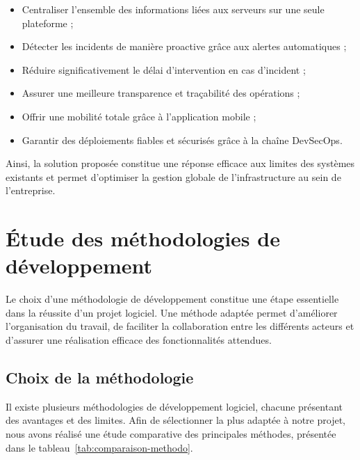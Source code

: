 \begin{itemize}[label=]
\item Centraliser l'ensemble des informations liées aux serveurs sur une seule
      plateforme ;
\item Détecter les incidents de manière proactive grâce aux alertes automatiques ;
\item Réduire significativement le délai d'intervention en cas d'incident ;
\item Assurer une meilleure transparence et traçabilité des opérations ;
\item Offrir une mobilité totale grâce à l'application mobile ;
\item Garantir des déploiements fiables et sécurisés grâce à la chaîne DevSecOps.
\end{itemize}

Ainsi, la solution proposée constitue une réponse efficace aux limites des systèmes
existants et permet d'optimiser la gestion globale de l'infrastructure au sein de
l'entreprise.

\section{Étude des méthodologies de développement}
Le choix d'une méthodologie de développement constitue une étape essentielle dans la
réussite d'un projet logiciel. Une méthode adaptée permet d'améliorer l'organisation du
travail, de faciliter la collaboration entre les différents acteurs et d'assurer une
réalisation efficace des fonctionnalités attendues.

\subsection{Choix de la méthodologie}
Il existe plusieurs méthodologies de développement logiciel, chacune présentant des
avantages et des limites. Afin de sélectionner la plus adaptée à notre projet, nous
avons réalisé une étude comparative des principales méthodes, présentée dans le
tableau~\ref{tab:comparaison-methodo}.

